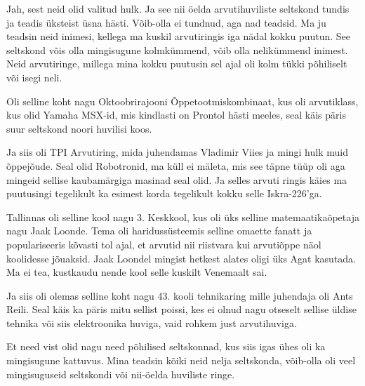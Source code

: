 
Jah, sest neid olid valitud hulk. Ja see nii öelda arvutihuviliste seltskond 
tundis ja teadis üksteist üsna hästi. Võib-olla ei tundnud, aga nad teadsid. Ma 
ju teadsin neid inimesi, kellega ma kuskil arvutiringis iga nädal kokku puutun. 
See seltskond võis olla mingisugune kolmkümmend, võib olla nelikümmend inimest. 
Neid arvutiringe,  millega mina kokku puutusin sel ajal oli kolm tükki 
põhiliselt või isegi neli. 

Oli selline koht nagu Oktoobrirajooni Õppetootmiskombinaat, kus oli arvutiklass, kus  olid Yamaha 
MSX-id, mis kindlasti on Prontol 
hästi meeles, seal käis päris suur seltskond noori huvilisi koos. 

Ja siis oli TPI Arvutiring, mida juhendamas 
Vladimir Viies ja mingi hulk muid õppejõude. Seal 
olid Robotronid, ma küll ei mäleta, mis see täpne tüüp 
oli aga mingeid  sellise kaubamärgiga masinad seal olid. Ja selles arvuti 
ringis käies ma puutusingi tegelikult ka esimest korda tegelikult kokku selle 
Iskra-226'ga.

Tallinnas oli selline kool nagu 3. Keskkool, 
kus oli üks selline matemaatikaõpetaja nagu Jaak Loonde. Tema oli haridussüsteemis selline omaette fanatt ja  populariseeris 
kõvasti tol ajal, et arvutid nii riistvara kui arvutiõppe näol koolidesse 
jõuaksid. Jaak Loondel  mingist hetkest alates oligi üks 
Agat kasutada. Ma ei tea, kustkaudu nende kool selle 
kuskilt Venemaalt sai. 

Ja siis oli olemas selline koht nagu 43. kooli 
tehnikaring mille juhendaja oli Ants Reili. Seal käis ka 
päris mitu sellist poissi, kes ei olnud nagu otseselt sellise üldise tehnika 
või siis elektroonika huviga, vaid rohkem  just arvutihuviga.

Et need vist olid nagu need põhilised seltskonnad, kus siis igas ühes oli  ka 
mingisugune kattuvus. Mina teadsin  kõiki neid nelja seltskonda, võib-olla oli 
veel mingisuguseid seltskondi või nii-öelda  huviliste ringe.


